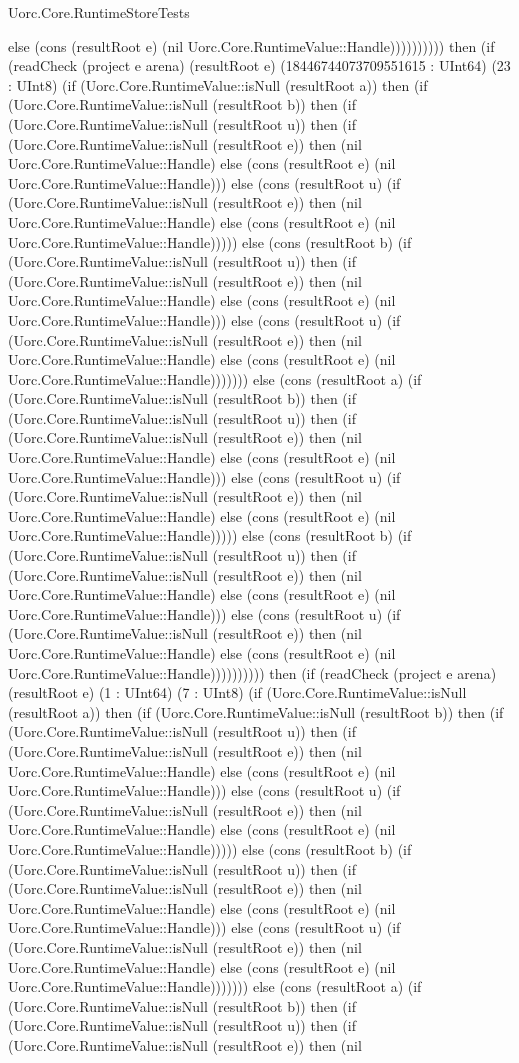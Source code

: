 \begin{lexlean}{Uorc.Core.RuntimeStoreTests}
\begin{semanticmodule}
{else (cons (resultRoot e) (nil Uorc.Core.RuntimeValue::Handle)))))))))) then (if (readCheck (project e arena) (resultRoot e) (18446744073709551615 : UInt64) (23 : UInt8) (if (Uorc.Core.RuntimeValue::isNull (resultRoot a)) then (if (Uorc.Core.RuntimeValue::isNull (resultRoot b)) then (if (Uorc.Core.RuntimeValue::isNull (resultRoot u)) then (if (Uorc.Core.RuntimeValue::isNull (resultRoot e)) then (nil Uorc.Core.RuntimeValue::Handle) else (cons (resultRoot e) (nil Uorc.Core.RuntimeValue::Handle))) else (cons (resultRoot u) (if (Uorc.Core.RuntimeValue::isNull (resultRoot e)) then (nil Uorc.Core.RuntimeValue::Handle) else (cons (resultRoot e) (nil Uorc.Core.RuntimeValue::Handle))))) else (cons (resultRoot b) (if (Uorc.Core.RuntimeValue::isNull (resultRoot u)) then (if (Uorc.Core.RuntimeValue::isNull (resultRoot e)) then (nil Uorc.Core.RuntimeValue::Handle) else (cons (resultRoot e) (nil Uorc.Core.RuntimeValue::Handle))) else (cons (resultRoot u) (if (Uorc.Core.RuntimeValue::isNull (resultRoot e)) then (nil Uorc.Core.RuntimeValue::Handle) else (cons (resultRoot e) (nil Uorc.Core.RuntimeValue::Handle))))))) else (cons (resultRoot a) (if (Uorc.Core.RuntimeValue::isNull (resultRoot b)) then (if (Uorc.Core.RuntimeValue::isNull (resultRoot u)) then (if (Uorc.Core.RuntimeValue::isNull (resultRoot e)) then (nil Uorc.Core.RuntimeValue::Handle) else (cons (resultRoot e) (nil Uorc.Core.RuntimeValue::Handle))) else (cons (resultRoot u) (if (Uorc.Core.RuntimeValue::isNull (resultRoot e)) then (nil Uorc.Core.RuntimeValue::Handle) else (cons (resultRoot e) (nil Uorc.Core.RuntimeValue::Handle))))) else (cons (resultRoot b) (if (Uorc.Core.RuntimeValue::isNull (resultRoot u)) then (if (Uorc.Core.RuntimeValue::isNull (resultRoot e)) then (nil Uorc.Core.RuntimeValue::Handle) else (cons (resultRoot e) (nil Uorc.Core.RuntimeValue::Handle))) else (cons (resultRoot u) (if (Uorc.Core.RuntimeValue::isNull (resultRoot e)) then (nil Uorc.Core.RuntimeValue::Handle) else (cons (resultRoot e) (nil Uorc.Core.RuntimeValue::Handle)))))))))) then (if (readCheck (project e arena) (resultRoot e) (1 : UInt64) (7 : UInt8) (if (Uorc.Core.RuntimeValue::isNull (resultRoot a)) then (if (Uorc.Core.RuntimeValue::isNull (resultRoot b)) then (if (Uorc.Core.RuntimeValue::isNull (resultRoot u)) then (if (Uorc.Core.RuntimeValue::isNull (resultRoot e)) then (nil Uorc.Core.RuntimeValue::Handle) else (cons (resultRoot e) (nil Uorc.Core.RuntimeValue::Handle))) else (cons (resultRoot u) (if (Uorc.Core.RuntimeValue::isNull (resultRoot e)) then (nil Uorc.Core.RuntimeValue::Handle) else (cons (resultRoot e) (nil Uorc.Core.RuntimeValue::Handle))))) else (cons (resultRoot b) (if (Uorc.Core.RuntimeValue::isNull (resultRoot u)) then (if (Uorc.Core.RuntimeValue::isNull (resultRoot e)) then (nil Uorc.Core.RuntimeValue::Handle) else (cons (resultRoot e) (nil Uorc.Core.RuntimeValue::Handle))) else (cons (resultRoot u) (if (Uorc.Core.RuntimeValue::isNull (resultRoot e)) then (nil Uorc.Core.RuntimeValue::Handle) else (cons (resultRoot e) (nil Uorc.Core.RuntimeValue::Handle))))))) else (cons (resultRoot a) (if (Uorc.Core.RuntimeValue::isNull (resultRoot b)) then (if (Uorc.Core.RuntimeValue::isNull (resultRoot u)) then (if (Uorc.Core.RuntimeValue::isNull (resultRoot e)) then (nil }
\end{semanticmodule}
\end{lexlean}
